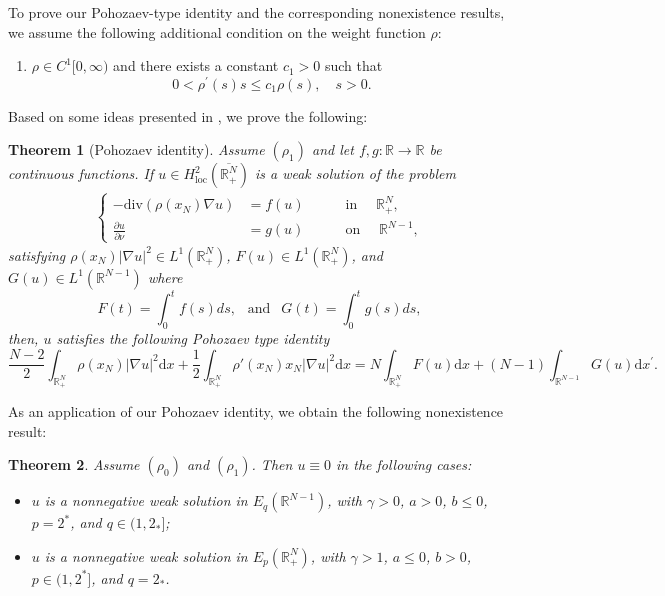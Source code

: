 \documentclass[12pt,reqno]{amsart}
\newtheorem{theorem}{Theorem}[section]
\begin{document}
To prove our Pohozaev-type identity and the corresponding nonexistence results, we assume the following additional condition on the weight function $\rho$:
\begin{enumerate}
\item [$(\rho_1)$]$\rho \in C^1[0,\infty)$ and there exists a constant $c_1>0$ such that 
$$
0< \rho^\prime(s)s\leq c_1 \rho(s), \quad s>0.
$$
\end{enumerate}
Based on some ideas presented in \cite{CAOM, Ilyasov-Takac}, we prove the following:

    \begin{theorem}[Pohozaev identity]\label{Pohozaev} Assume $(\rho_1)$ and let $f,g:\mathds{R}\longrightarrow\mathds{R}$ be continuous functions. If $u\in  H^2_{\mathrm{loc}}(\overline{\mathds{R}^N_+})$ is a weak solution of the problem
		\begin{align*}
			\left\{
			\begin{aligned}
				-\mathrm{div}(\rho(x_N) \nabla u)&=f(u)&\quad&\text{ in }\quad\mathds{R}_{+}^{N},\\
				\frac{\partial u}{\partial \nu}&=g(u)&\quad&\text{ on }\quad\mathds{R}^{N-1},
			\end{aligned}
			\right.
		\end{align*}
		satisfying $\rho(x_N)|\nabla u|^2\in L^1(\mathds{R}^N_+)$, $F(u)\in L^1(\mathds{R}^N_+)$, and $G(u)\in L^1(\mathds{R}^{N-1})$  where 
		\[
		F(t)=\int_0^tf(s)ds, \ \ \mbox{ and }\ \ G(t)=\int_0^tg(s)ds,
		\]
		then, $u$ satisfies the following Pohozaev type identity
		\[
		\frac{N-2}{2}\int_{\mathds{R}_{+}^{N}}\rho(x_N)|\nabla u|^2\mathrm{d}x+\frac{1}{2}\int_{\mathds{R}_{+}^{N}}\rho'(x_N)x_N|\nabla u|^2\mathrm{d}x=N\int_{\mathds{R}^N_+}F(u)\mathrm{d}x+(N-1)\int_{\mathds{R}^{N-1}}G(u)\mathrm{d}x^\prime.
		\]
	\end{theorem}

As an application of our Pohozaev identity, we obtain the following nonexistence result:

\begin{theorem}\label{Nonexistence1}
Assume $(\rho_0)$ and $(\rho_1)$. Then $u\equiv 0$ in the following cases:
\begin{itemize}
\item[$(i)$] $u$ is a nonnegative weak solution in $E_q(\mathds{R}^{N-1})$, with $\gamma > 0$, $a > 0$, $b \leq 0$, $p = 2^\ast$, and $q \in (1, 2_\ast]$;
\item[$(ii)$] $u$ is a nonnegative weak solution in $E_p(\mathds{R}^N_+)$, with $\gamma > 1$, $a \leq 0$, $b > 0$, $p \in (1, 2^\ast]$, and $q = 2_\ast$.
\end{itemize}
\end{theorem}
\end{document}
